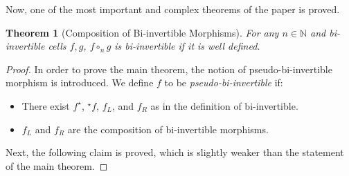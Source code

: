 \documentclass{article}
\newtheorem{theorem}{Theorem}
\theoremstyle{definition}
\theoremstyle{remark}
\newcommand{\linv}[1]{{}^\star\!#1}
\newcommand{\rinv}[1]{#1^\star}
\begin{document}
\noindent Now, one of the most important and complex theorems of the paper is proved.

\begin{theorem}[Composition of Bi-invertible Morphisms]
  For any \(n \in \mathbb{N}\) and bi-invertible cells \(f,g\), \(f \circ_n g\) is bi-invertible if it is well defined.
\end{theorem}
\begin{proof}
  In order to prove the main theorem, the notion of pseudo-bi-invertible morphism is introduced. We define \(f\) to be \emph{pseudo-bi-invertible} if:
  \begin{itemize}
  \item There exist \(\rinv f\), \(\linv f\), \(f_L\), and \(f_R\) as in the definition of bi-invertible.
  \item \(f_L\) and \(f_R\) are the composition of bi-invertible morphisms.
  \end{itemize}

  Next, the following claim is proved, which is slightly weaker than the statement of the main theorem.


\end{proof}
\end{document}
